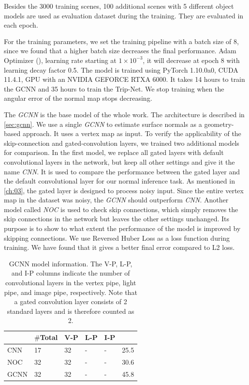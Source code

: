 Besides the 3000 training scenes, 100 additional scenes with 5 different object models are used as evaluation dataset during the training. They are evaluated in each epoch. 

For the training parameters, we set the training pipeline with a batch size of 8, since we found that a higher batch size decreases the final performance.  Adam Optimizer (\cite{adam}), learning rate starting at $ 1\times10^{-3} $, it will decrease at epoch 8 with learning decay factor 0.5. The model is trained using PyTorch 1.10.0a0, CUDA 11.4.1, GPU with an NVIDIA GEFORCE RTXA 6000. It takes 14 hours to train the GCNN and 35 hours to train the Trip-Net. We stop training when the angular error of the normal map stops decreasing.

\begin{flushright}
	
\end{flushright}
The \textit{GCNN} is the base model of the whole work. The architecture is described in \ref{sec:gcnn}. We use a single \textit{GCNN} to estimate surface normals as a geometry-based approach. It uses a vertex map as input. To verify the applicability of the skip-connection and gated-convolution layers, we trained two additional models for comparison. 
In the first model, we replace all gated layers with default convolutional layers in the network, but keep all other settings and give it the name \textit{CNN}. It is used to compare the performance between the gated layer and the default convolutional layer for our normal inference task. As mentioned in \ref{ch:03}, the gated layer is designed to process noisy input. Since the entire vertex map in the dataset was noisy, the \textit{GCNN} should outperform \textit{CNN}. 
Another model called \textit{NOC} is used to check skip connections, which simply removes the skip connections in the network but leaves the other settings unchanged. Its purpose is to show to what extent the performance of the model is improved by skipping connections. We use Reversed Huber Loss as a loss function during training. We have found that it gives a better final error compared to L2 loss. 



\begin{table}[H]
	\centering
	\captionsetup{width=\linewidth}
	\begin{tabular}{l | l l l l l }
		\toprule
		\tabhead{Model} & $ \# $\textbf{Total} &\textbf{ V-P} & \textbf{L-P} & \textbf{I-P} & \tabhead{Size /MB}\\
		\midrule
		\hline
		CNN 					& 17 & 32 & - & - & 25.5 \\
		\hline
		NOC 					& 32 & 32 & - & - & 30.6 \\
		\hline
		GCNN 					& 32 & 32 & - & - & 45.8 \\
		\bottomrule
	\end{tabular}
	\caption{GCNN model information. The V-P, L-P, and I-P columns indicate the number of convolutional layers in the vertex pipe, light pipe, and image pipe, respectively. Note that a gated convolution layer consists of 2 standard layers and is therefore counted as 2.}	
	\label{tab:gcnn-eval-mean}
\end{table}


